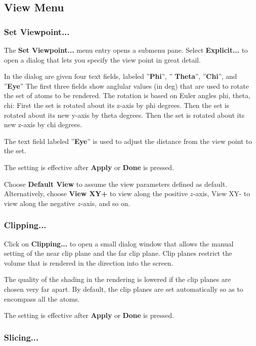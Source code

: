 \documentclass[11pt]{article}
\begin{document}
\subsection{View Menu}

\subsubsection{Set Viewpoint...}

The {\bf Set Viewpoint...} menu entry opens a submenu pane.  Select 
{\bf Explicit...} to open a dialog that lets you specify the view point
in great detail.

In the dialog are given four text fields, labeled ''{\bf Phi}'', ''{\bf
Theta}'', ''{\bf Chi}'', and ''{\bf Eye}'' The first three fields show anglular
values (in deg) that are used to rotate the set of atoms to be rendered.  The
rotation is based on Euler angles phi, theta, chi: First the set is rotated
about its z-axis by phi degrees.  Then the set is rotated about its new y-axis
by theta degrees.  Then the set is rotated about its new z-axis by chi degrees.

The text field labeled ''{\bf Eye}'' is used to adjust the distance from the
view point to the set.

The setting is effective after {\bf Apply} or {\bf Done} is pressed.

Choose {\bf Default View} to assume the view parameters defined as default.
Alternatively, choose {\bf View XY+} to view along the positive $z$-axis, {View
XY-} to view along the negative $z$-axis, and so on.

\subsubsection{Clipping...}

Click on {\bf Clipping...} to open a small dialog window that allows the manual
setting of the near clip plane and the far clip plane.  Clip planes restrict
the volume that is rendered in the direction into the screen.  

The quality of the shading in the rendering is lowered if the clip planes are
chosen very far apart.  By default, the clip planes are set automatically so as
to encompass all the atoms.  

The setting is effective after {\bf Apply} or {\bf Done} is pressed.

\subsubsection{Slicing...}
\end{document}
